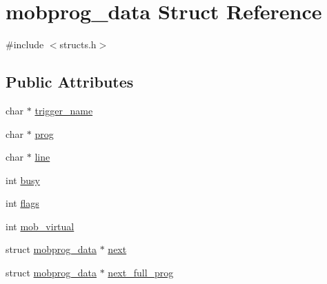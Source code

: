 \hypertarget{structmobprog__data}{\section{mobprog\-\_\-data Struct Reference}
\label{structmobprog__data}
}


{\ttfamily \#include $<$structs.\-h$>$}

\subsection*{Public Attributes}
\begin{DoxyCompactItemize}
\item 
char $\ast$ \hyperlink{structmobprog__data_a8c82dd5e0c02cf72982f88cd482cd974}{trigger\-\_\-name}
\item 
char $\ast$ \hyperlink{structmobprog__data_ad47f07fae4eb7e609d5afd35b2355b1d}{prog}
\item 
char $\ast$ \hyperlink{structmobprog__data_a4d82709d17bf2744c6e14cb836d70a72}{line}
\item 
int \hyperlink{structmobprog__data_aed5b719664a71a6802a9853d1a1c613c}{busy}
\item 
int \hyperlink{structmobprog__data_a8ff527d51c7f34baf992f26576c26e9b}{flags}
\item 
int \hyperlink{structmobprog__data_a49bbc3e41c8fdcd14c08729e1fc1b6fb}{mob\-\_\-virtual}
\item 
struct \hyperlink{structmobprog__data}{mobprog\-\_\-data} $\ast$ \hyperlink{structmobprog__data_aaa16ae74c608143c69ef7ecb080db55b}{next}
\item 
struct \hyperlink{structmobprog__data}{mobprog\-\_\-data} $\ast$ \hyperlink{structmobprog__data_adba12d3319a1406d6ff96e3d2803efd0}{next\-\_\-full\-\_\-prog}
\end{DoxyCompactItemize}


